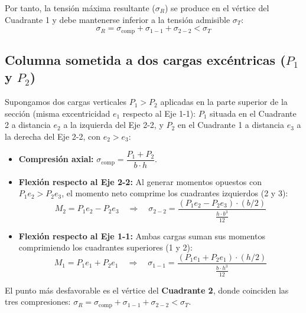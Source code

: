 Por tanto, la tensión máxima resultante ($\sigma_R$) se produce en el vértice del Cuadrante 1 y debe mantenerse inferior a la tensión admisible $\sigma_T$:
\begin{equation}
    \sigma_R = \sigma_{\text{comp}} + \sigma_{1-1} + \sigma_{2-2} < \sigma_T
    \label{eq:t9_sigmaR_doble}
\end{equation}

\subsection{Columna sometida a dos cargas excéntricas ($P_1$ y $P_2$)}
Supongamos dos cargas verticales $P_1 > P_2$ aplicadas en la parte superior de la sección (misma excentricidad $e_1$ respecto al Eje 1-1): $P_1$ situada en el Cuadrante 2 a distancia $e_2$ a la izquierda del Eje 2-2, y $P_2$ en el Cuadrante 1 a distancia $e_3$ a la derecha del Eje 2-2, con $e_2 > e_3$:
\begin{itemize}
    \item \textbf{Compresión axial:} $\sigma_{\text{comp}} = \dfrac{P_1 + P_2}{b\cdot h}$.
    \item \textbf{Flexión respecto al Eje 2-2:} Al generar momentos opuestos con $P_1 e_2 > P_2 e_3$, el momento neto comprime los cuadrantes izquierdos (2 y 3):
          \begin{equation*}
              M_2 = P_1 e_2 - P_2 e_3 \quad \Longrightarrow \quad \sigma_{2-2} = \frac{(P_1 e_2 - P_2 e_3)\cdot (b/2)}{\frac{h\cdot b^3}{12}}
          \end{equation*}
    \item \textbf{Flexión respecto al Eje 1-1:} Ambas cargas suman sus momentos comprimiendo los cuadrantes superiores (1 y 2):
          \begin{equation*}
              M_1 = P_1 e_1 + P_2 e_1 \quad \Longrightarrow \quad \sigma_{1-1} = \frac{(P_1 e_1 + P_2 e_1)\cdot (h/2)}{\frac{b\cdot h^3}{12}}
          \end{equation*}
\end{itemize}
El punto más desfavorable es el vértice del \textbf{Cuadrante 2}, donde coinciden las tres compresiones: $\sigma_R = \sigma_{\text{comp}} + \sigma_{1-1} + \sigma_{2-2} < \sigma_T$.

